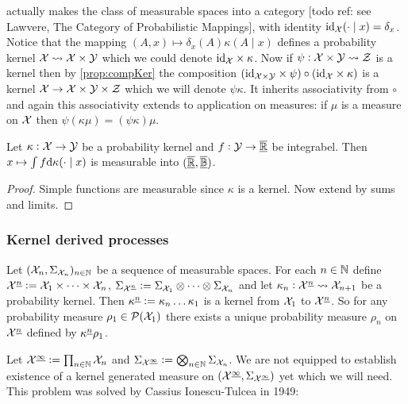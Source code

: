  actually makes the class of measurable spaces
into a category [todo ref: see Lawvere, The Category of Probabilistic
Mappings], with identity $\text{id}_{\mathcal{X}}(\cdot \mid x) = \delta_x$.
Notice that the mapping $(A, x) \mapsto \delta_x(A) \kappa(A \mid x)$
defines a probability kernel $\mathcal{X} \leadsto \mathcal{X} \times \mathcal{Y}$
which we could denote $\text{id}_{\mathcal{X}} \times \kappa$.
Now if $\psi : \mathcal{X} \times \mathcal{Y} \leadsto \mathcal{Z}$ is a kernel
then by \cref{prop:compKer} the composition
$(\text{id}_{\mathcal{X} \times \mathcal{Y}} \times \psi)
\circ (\text{id}_{\mathcal{X}} \times \kappa)$
is a kernel $\mathcal{X} \to \mathcal{X} \times \mathcal{Y} \times \mathcal{Z}$
which we will denote $\psi \kappa$.
It inherits associativity from $\circ$ and again this associativity
extends to application on measures: if $\mu$ is a measure on $\mathcal{X}$
then $\psi (\kappa \mu) = (\psi \kappa) \mu$.

\begin{prop}
  Let $\kappa : \mathcal{X} \to \mathcal{Y}$ be a probability kernel
  and $f : \mathcal{Y} \to \overline{\underline{\mathbb{R}}}$ be integrabel.
  Then $x \mapsto \int f \mathrm{d} \kappa(\cdot \mid x)$ is measurable
  into $(\overline{\underline{\mathbb{R}}}, \overline{\underline{\mathbb{B}}})$.
  \label{prop:intKerMeas}
\end{prop}
\begin{proof}
  Simple functions are measurable since $\kappa$ is a kernel.
  Now extend by sums and limits.
\end{proof}

\subsubsection{Kernel derived processes}

Let $(\mathcal{X}_n, \Sigma_{\mathcal{X}_n})_{n \in \mathbb{N}}$ be a sequence
of measurable spaces. For each $n \in \mathbb{N}$ define
$\mathcal{X}^{\underline{n}} \vcentcolon= \mathcal{X}_1 \times \dots \times \mathcal{X}_n$,
$\Sigma_{\mathcal{X}^{\underline{n}}} \vcentcolon= \Sigma_{\mathcal{X}_1} \otimes
\dots \otimes \Sigma_{\mathcal{X}_n}$
and let
$\kappa_n : \mathcal{X}^{\underline{n}} \leadsto \mathcal{X}_{n+1}$ be a probability kernel.
Then $\kappa^{\underline{n}} \vcentcolon= \kappa_n \dots \kappa_1$ is a kernel
from $\mathcal{X}_1$ to $\mathcal{X}^{\underline{n}}$.
So for any probability measure $\rho_1 \in \mathcal{P}(\mathcal{X}_1)$
there exists a unique probability measure 
$\rho_n$ on $\mathcal{X}^{\underline{n}}$ defined by
$\kappa^{\underline{n}} \rho_1$.

Let $\mathcal{X}^{\underline{\infty}} \vcentcolon= \prod_{n \in \mathbb{N}} \mathcal{X}_n$
and $\Sigma_{\mathcal{X}^{\underline{\infty}}} \vcentcolon= \bigotimes_{n \in \mathbb{N}}
\Sigma_{\mathcal{X}_n}$.
We are not equipped to establish existence of a
kernel generated measure on
$(\mathcal{X}^{\underline{\infty}}, \Sigma_{\mathcal{X}^{\underline{\infty}}})$ 
yet which we will need.
This problem was solved by Cassius Ionescu-Tulcea in 1949:

